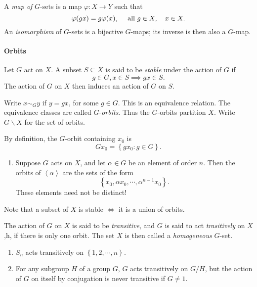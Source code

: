 \begin{definition}
  A \emph{map of} \( G \)-sets is a map \( \varphi: X \to Y \) such that
  \[
    \varphi(gx) = g\varphi(x),\quad \textmd{ all } g \in X,\quad x \in X.
  \]
  An \emph{isomorphism} of \( G \)-sets is a bijective \( G \)-maps; its inverse is then also a \( G \)-map.
\end{definition}

\paragraph{Orbits}

\begin{definition}
  Let \( G \) act on \( X \).
  A subset \( S \subseteq X \) is said to be \emph{stable} under the action of \( G \) if
  \[
    g \in G, x \in S \implies gx \in S.
  \]
  The action of \( G \) on \( X \) then induces an action of \( G \) on \( S \).
\end{definition}

\begin{definition}
  Write \( x \sim_G y \) if \( y = gx \), for some \( g \in G \).
  This is an equivalence relation.
  The equivalence classes are called \( G \)-\emph{orbits}.
  Thus the \( G \)-orbits partition \( X \).
  Write \( G \backslash X \) for the set of orbits.
\end{definition}
By definition, the \( G \)-orbit containing \( x_0 \) is
\[
  G x_0 = \left\lbrace g x_0: g \in G \right\rbrace.
\]

\begin{example}
  \begin{enumerate}
    \item Suppose \( G \) acts on \( X \), and let \( \alpha \in G \) be an element of order \( n \).
      Then the orbits of \( \left\langle \alpha \right\rangle \) are the sets of the form
      \[
        \left\lbrace x_0, \alpha x_0, \cdots, \alpha^{n - 1}x_0 \right\rbrace.
      \]
      These elements need not be distinct!
  \end{enumerate}
\end{example}

Note that a subset of \( X \) is stable \( \iff \) it is a union of orbits.

\begin{definition}
  The action of \( G \) on \( X \) is said to be \emph{transitive}, and \( G \) is said to act \emph{trasitively} on \( X \),h, if there is only one orbit.
  The set \( X \) is then called a \emph{homogeneous} \( G \)-set.
\end{definition}
\begin{example}
  \begin{enumerate}
    \item \( S_n \) acts transitively on \( \left\lbrace 1, 2, \cdots, n \right\rbrace \).
    \item For any subgroup \( H \) of a group \( G \), \( G \) acts transitively on \( G / H \), but the action of \( G \) on itself by conjugation is never transitive if \( G \neq 1 \).
  \end{enumerate}
\end{example}

